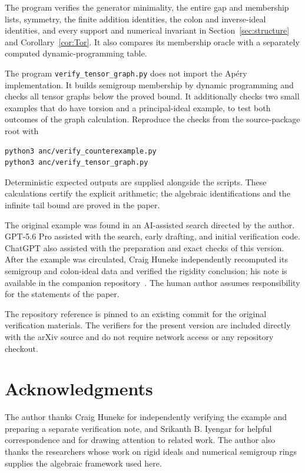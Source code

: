 \documentclass[11pt,letterpaper]{article}
\theoremstyle{remark}
\numberwithin{equation}{section}
\begin{document}
The program verifies the generator minimality, the entire gap and membership lists, symmetry, the finite addition identities, the colon and inverse-ideal identities, and every support and numerical invariant in Section~\ref{sec:structure} and Corollary~\ref{cor:Tor}. It also compares its membership oracle with a separately computed dynamic-programming table.

The program \texttt{verify\_tensor\_graph.py} does not import the Ap\'ery implementation. It builds semigroup membership by dynamic programming and checks all tensor graphs below the proved bound. It additionally checks two small examples that do have torsion and a principal-ideal example, to test both outcomes of the graph calculation. Reproduce the checks from the source-package root with
\begin{verbatim}
python3 anc/verify_counterexample.py
python3 anc/verify_tensor_graph.py
\end{verbatim}
Deterministic expected outputs are supplied alongside the scripts. These calculations certify the explicit arithmetic; the algebraic identifications and the infinite tail bound are proved in the paper.

The original example was found in an AI-assisted search directed by the author. GPT-5.6 Pro assisted with the search, early drafting, and initial verification code. ChatGPT also assisted with the preparation and exact checks of this version. After the example was circulated, Craig Huneke independently recomputed its semigroup and colon-ideal data and verified the rigidity conclusion; his note is available in the companion repository~\cite{HunekeNote,PhamRepo}. The human author assumes responsibility for the statements of the paper.

The repository reference is pinned to an existing commit for the original verification materials. The verifiers for the present version are included directly with the arXiv source and do not require network access or any repository checkout.

\section*{Acknowledgments}
The author thanks Craig Huneke for independently verifying the example and preparing a separate verification note, and Srikanth B. Iyengar for helpful correspondence and for drawing attention to related work. The author also thanks the researchers whose work on rigid ideals and numerical semigroup rings supplies the algebraic framework used here.
\end{document}
